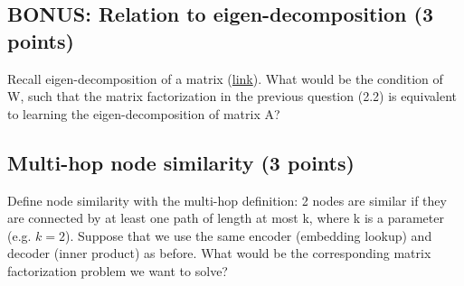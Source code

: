 
\subsection{BONUS: Relation to eigen-decomposition (3 points)}
Recall eigen-decomposition of a matrix (\href{https://en.wikipedia.org/wiki/Eigendecomposition_of_a_matrix}{link}). What would be the condition of W, such that the matrix factorization in the previous question (2.2) is equivalent to learning the eigen-decomposition of matrix A?


\subsection{Multi-hop node similarity (3 points)}
Define node similarity with the multi-hop definition: 2 nodes are similar if they are connected by at least one path of length at most k, where k is a parameter (e.g. $k = 2$). Suppose that we use the same encoder (embedding lookup) and decoder (inner product) as before. What would be the corresponding matrix factorization problem we want to solve?



